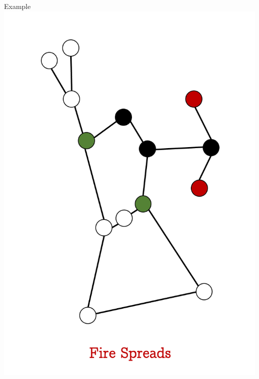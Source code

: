 \documentclass[unknownkeysallowed]{beamer}
\begin{document}
\begin{frame}{Example}
\centering\includegraphics[height=0.8\textheight]{assets/eg-fire/5}
\end{frame}
\end{document}

